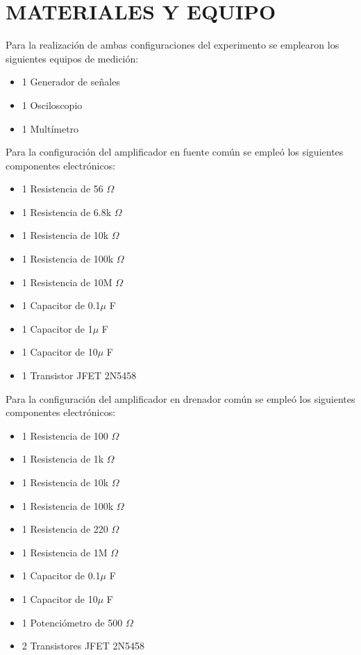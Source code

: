 \documentclass[journal]{IEEEtran}
\begin{document}
	\section{MATERIALES Y EQUIPO}
	Para la realización de ambas configuraciones del experimento se emplearon los siguientes equipos de medición:
	\begin{itemize}
		\item 1 Generador de señales
		\item 1 Osciloscopio
		\item 1 Multímetro
	\end{itemize}
	\par Para la configuración del amplificador en fuente común se empleó los siguientes componentes electrónicos:
	\begin{itemize}
		\item 1 Resistencia de 56 $\Omega$
		\item 1 Resistencia de 6.8k $\Omega$
		\item 1 Resistencia de 10k $\Omega$
		\item 1 Resistencia de 100k $\Omega$
		\item 1 Resistencia de 10M $\Omega$
		\item 1 Capacitor de 0.1$\mu$ F
		\item 1 Capacitor de 1$\mu$ F
		\item 1 Capacitor de 10$\mu$ F
		\item 1 Transistor JFET 2N5458 
	\end{itemize}
	\par Para la configuración del amplificador en drenador común se empleó los siguientes componentes electrónicos:
	\begin{itemize}
		\item 1 Resistencia de 100 $\Omega$
		\item 1 Resistencia de 1k $\Omega$
		\item 1 Resistencia de 10k $\Omega$
		\item 1 Resistencia de 100k $\Omega$
		\item 1 Resistencia de 220 $\Omega$
		\item 1 Resistencia de 1M $\Omega$
		\item 1 Capacitor de 0.1$\mu$ F
		\item 1 Capacitor de 10$\mu$ F
		\item 1 Potenciómetro de 500 $\Omega$
		\item 2 Transistores JFET 2N5458
	\end{itemize}
	
\end{document}
